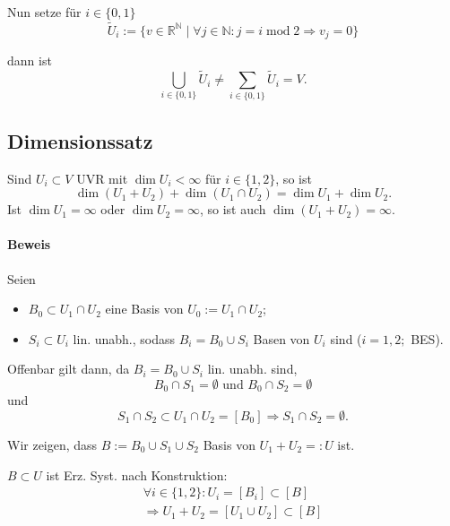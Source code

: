 	Nun setze für $ i\in \{0,1\} $
		\begin{equation*}
		\tilde{U}_i := \{v\in \mathbb{R}^\mathbb{N}\mid \forall j\in \mathbb{N}: j=i\operatorname{mod} 2\Rightarrow v_j = 0\}
		\end{equation*}
		
	dann ist 
		\begin{equation*}
		\bigcup_{i\in \{0,1\}}\tilde{U}_i \neq \sum_{i\in \{0,1\}}\tilde{U}_i = V.
		\end{equation*}
		
\subsection{Dimensionssatz}
	\begin{Satz}[Dimensionssatz]
	Sind $ U_i \subset V $ UVR mit $ \dim U_i < \infty $ für $ i\in \{1,2\} $, so ist
		\[ \dim (U_1+U_2) + \dim (U_1\cap U_2) = \dim U_1 + \dim U_2. \]	
	Ist $ \dim U_1 = \infty$ oder $ \dim U_2=\infty $, so ist auch $ \dim (U_1+U_2)=\infty $.
	\end{Satz}
	
\paragraph{Beweis}
	Seien
		\begin{itemize}
		\item $ B_0 \subset U_1\cap U_2 $ eine Basis von $ U_0 := U_1\cap U_2 $;
		\item $ S_i \subset U_i $ lin. unabh., sodass $ B_i = B_0 \cup S_i $ Basen von $ U_i $ sind ($ i = 1,2; $ BES).
		\end{itemize}
	
	Offenbar gilt dann, da $ B_i = B_0\cup S_i $ lin. unabh. sind,
		\begin{equation*}
		B_0\cap S_1 = \emptyset \text{ und } B_0\cap S_2 = \emptyset
		\end{equation*}
	und 
		\begin{equation*}
		S_1\cap S_2 \subset U_1\cap U_2 = [B_0] \Rightarrow S_1\cap S_2 = \emptyset.
		\end{equation*}
		
	Wir zeigen, dass $ B:= B_0\cup S_1\cup S_2 $ Basis von $ U_1 + U_2 =: U $ ist.
	
	$ B\subset U $ ist Erz. Syst. nach Konstruktion:
		\begin{gather*}
		\forall i\in \{1,2\} : U_i=[B_i]\subset [B]\\
		\Rightarrow U_1+U_2 = [U_1\cup U_2]\subset [B]
		\end{gather*}
	
